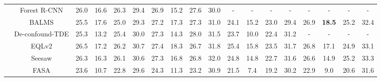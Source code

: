 \documentclass[lettersize,journal]{IEEEtran}
\begin{document}
\begin{table*}[t]
{\begin{tabular}{c|c|cccccccc|cccccccc}
                                     & Forest R-CNN\cite{wu2020forest}             & 26.0          & 16.6          & 26.3          & \multicolumn{1}{c|}{29.4}          & 26.9          & 15.2          & 27.6          & 30.0          & \multicolumn{1}{c|}{-}             & -             & -             & \multicolumn{1}{c|}{-}             & \multicolumn{1}{c|}{-}             & -             & -             & -             \\
                                     & BALMS\cite{ren2020balanced}                    & 25.5          & 17.6          & 25.0          & \multicolumn{1}{c|}{29.3}          & 27.2          & 17.3          & 27.3          & 31.0          & \multicolumn{1}{c|}{24.1}          & 15.2          & 23.0          & \multicolumn{1}{c|}{29.4}          & \multicolumn{1}{c|}{26.9}          & \textbf{18.5} & 25.2          & 32.4          \\
                                     & De-confound-TDE\cite{tang2020long}           & 25.3          & 13.2          & 25.4          & \multicolumn{1}{c|}{30.0}          & 27.3          & 14.3          & 28.0          & 31.5          & \multicolumn{1}{c|}{23.7}          & 10.0          & 22.4          & \multicolumn{1}{c|}{31.2}          & \multicolumn{1}{c|}{-}             & -             & -             & -             \\
                                     & EQLv2\cite{tan2021equalization}                    & 26.5          & 17.2          & 26.2          & \multicolumn{1}{c|}{30.7}          & 27.4          & 18.3          & 26.7          & 31.8          & \multicolumn{1}{c|}{25.4}          & 15.8          & 23.5          & \multicolumn{1}{c|}{31.7}          & \multicolumn{1}{c|}{26.8}          & 17.1          & 24.9          & 33.1          \\
                                     & Seesaw\cite{wang2021seesaw}                   & 26.3          & 16.3          & 26.1          & \multicolumn{1}{c|}{30.6}          & 27.3          & 16.8          & 26.8          & 32.0          & \multicolumn{1}{c|}{24.8}          & 14.8          & 22.7          & \multicolumn{1}{c|}{31.6}          & \multicolumn{1}{c|}{26.6}          & 14.9          & 25.2          & 33.3          \\
                                     & FASA\cite{zang2021fasa}                    & 23.6          & 10.7          & 22.8          & \multicolumn{1}{c|}{29.6}          & 24.3          & 11.3          & 23.2          & 30.9          & \multicolumn{1}{c|}{21.5}          & 7.4           & 19.2          & \multicolumn{1}{c|}{30.2}          & \multicolumn{1}{c|}{22.9}             & 9.0             & 20.6             & 31.6             \\

\end{tabular}}
\end{table*}
\end{document}
